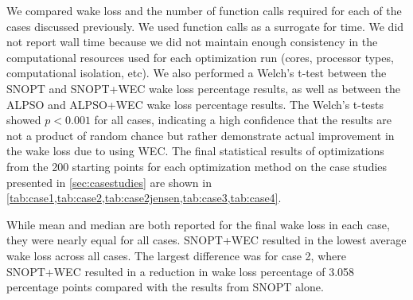\documentclass{jpconf}
\begin{document}
We compared wake loss and the number of function calls required for each of the cases discussed previously. We used function calls as a surrogate for time. We did not report wall time because we did not maintain enough consistency in the computational resources used for each optimization run (cores, processor types, computational isolation, etc). We also performed a Welch's t-test between the SNOPT and SNOPT+WEC wake loss percentage results, as well as between the ALPSO and ALPSO+WEC wake loss percentage results. The Welch's t-tests showed $p<0.001$ for all cases, indicating a high confidence that the results are not a product of random chance but rather demonstrate actual improvement in the wake loss due to using WEC. The final statistical results of optimizations from the 200 starting points for each optimization method on the case studies presented in \cref{sec:casestudies} are shown in \cref{tab:case1,tab:case2,tab:case2jensen,tab:case3,tab:case4}. 

 While mean and median are both reported for the final wake loss in each case, they were nearly equal for all cases. SNOPT+WEC resulted in the lowest average wake loss across all cases. The largest difference was for case 2, where SNOPT+WEC resulted in a reduction in wake loss percentage of 3.058 percentage points compared with the results from SNOPT alone.
 
\end{document}
